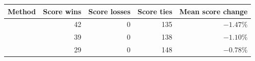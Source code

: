 \begin{tabular}{lrrrr}
\toprule
Method & Score wins & Score losses & Score ties & Mean score change \\
\midrule
\affinemethod{} & 42 & 0 & 135 & $-1.47\%$ \\
\method{} & 39 & 0 & 138 & $-1.10\%$ \\
\paretomethod{} & 29 & 0 & 148 & $-0.78\%$ \\
\bottomrule
\end{tabular}
